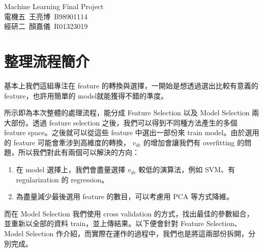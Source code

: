 

\newcommand{\link}[2]{ \href{#1}{\textcolor{Gray}{#2}}}
\newcommand{\statatab}[1]{
\begin{table}[H]\centering\begin{threeparttable}
\end{threeparttable}\end{table}}

\usepackage{enumitem}
\usepackage{mathabx}


\pagestyle{main}

\setlength{\baselineskip}{1.5em}
\setlength{\parskip}{0.25em}

\thispagestyle{empty}
\begin{center}
{\optima\LARGE Machine Learning Final Project}\\[0.5em]
電機五~王亮博~B98901114 \\
經研二~顏嘉儀~R01323019
\end{center}

\section{整理流程簡介}
基本上我們這組專注在 feature 的轉換與選擇，一開始是想透過選出比較有意義的 feature，也許用簡單的 model就能獲得不錯的準度。


 所示即為本次整體的處理流程，能分成 Feature Selection 以及 Model Selection 兩大部份。透過 feature selection 之後，我們可以得到不同種方法產生的多個 feature space。之後就可以從這些 feature 中選出一部份來 train model。由於選用的 feature 可能會牽涉到高維度的轉換， $v_{dc}$ 的增加會讓我們有 overfitting 的問題，所以我們對此有兩個可以解決的方向：
\begin{enumerate}[itemsep=-1ex, topsep=0ex]
\item 在 model 選擇上，我們會盡量選擇 $v_{dc}$ 較低的演算法，例如 SVM、有 regularization 的 regression。
\item 為盡量減少最後選用 feature 的數目，可以考慮用 PCA 等方式降維。
\end{enumerate}

而在 Model Selection 我們使用 cross validation 的方式，找出最佳的參數組合，並重新以全部的資料 train，並上傳結果。以下便會針對 Feature Selection、Model Selection 作介紹，而實際在運作的過程中，我們也是將這兩部份拆開，分別完成。


